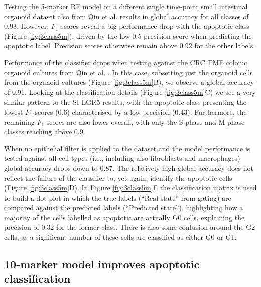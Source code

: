 Testing the 5-marker RF model on a different single time-point small intestinal organoid dataset also from Qin et al. \cite{qin_cell-type-specific_2020} results in global accuracy for all classes of 0.93. However, $F_1$ scores reveal a big performance drop with the apoptotic class (Figure \ref{fig:3class5m}), driven by the low 0.5 precision score when predicting the apoptotic label. Precision scores otherwise remain above 0.92 for the other labels.

Performance of the classifier drops when testing against the CRC TME colonic organoid cultures from Qin et al. \cite{qin_cell-type-specific_2020}. In this case, subsetting just the organoid cells from the organoid cultures (Figure \ref{fig:3class5m}B), we observe a global accuracy of 0.91. Looking at the classification details (Figure \ref{fig:3class5m}C) we see a very similar pattern to the SI LGR5 results; with the apoptotic class presenting the lowest $F_1$-scores (0.6) characterised by a low precision (0.43). Furthermore, the remaining $F_1$-scores are also lower overall, with only the S-phase and M-phase classes reaching above 0.9.

When no epithelial filter is applied to the dataset and the model performance is tested against all cell types (i.e., including also fibroblasts and macrophages) global accuracy drops down to 0.87. The relatively high global accuracy does not reflect the failure of the classifier to, yet again, identify the apoptotic cells (Figure \ref{fig:3class5m}D). In Figure \ref{fig:3class5m}E the classification matrix is used to build a dot plot in which the true labels (“Real state” from gating) are compared against the predicted labels (“Predicted state”), highlighting how a majority of the cells labelled as apoptotic are actually G0 cells, explaining the precision of 0.32 for the former class. There is also some confusion around the G2 cells, as a significant number of these cells are classified as either G0 or G1.

\subsection{10-marker model improves apoptotic classification}

